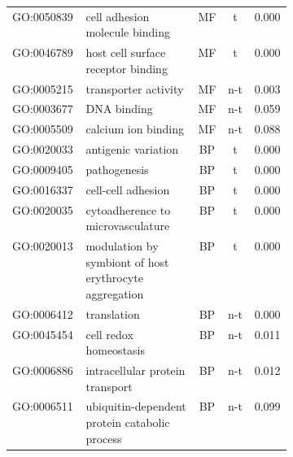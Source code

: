 \begin{table}
\begin{center}
\begin{tabular}{lp{0.4\linewidth}ccc}
GO:0050839 & cell adhesion molecule binding & MF & t & 0.000\\
GO:0046789 & host cell surface receptor binding & MF & t & 0.000\\
GO:0005215 & transporter activity & MF & n-t & 0.003\\
GO:0003677 & DNA binding & MF & n-t & 0.059\\
GO:0005509 & calcium ion binding & MF & n-t & 0.088\\
GO:0020033 & antigenic variation & BP & t & 0.000\\
GO:0009405 & pathogenesis & BP & t & 0.000\\
GO:0016337 & cell-cell adhesion & BP & t & 0.000\\
GO:0020035 & cytoadherence to microvasculature & BP & t & 0.000\\
GO:0020013 & modulation by symbiont of host erythrocyte aggregation & BP & t & 0.000\\
GO:0006412 & translation & BP & n-t & 0.000\\
GO:0045454 & cell redox homeostasis & BP & n-t & 0.011\\
GO:0006886 & intracellular protein transport & BP & n-t & 0.012\\
GO:0006511 & ubiquitin-dependent protein catabolic process & BP & n-t & 0.099\\
\hline
\end{tabular}
\end{center}
\label{table:TrophsFirstPro}
\end{table}
\clearpage

